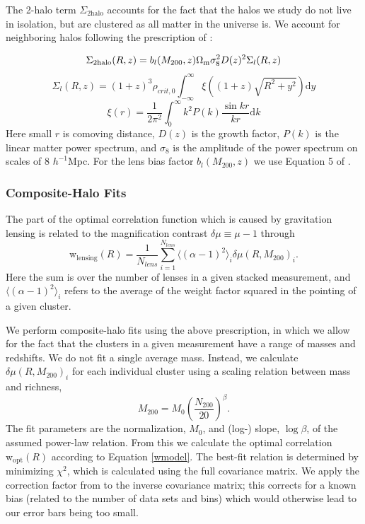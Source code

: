 The 2-halo term $\Sigma_{\mathrm{2halo}}$ accounts for the fact that the halos we study do not live in isolation, but are clustered as all matter in the universe is. We account for neighboring halos following the prescription of \citet{Johnston07}:

\begin{equation}
\Sigma_{\mathrm{2halo}}(R,z) = b_{l}(M_{200},z) \Omega_{\rm m} \sigma_8^2 D(z)^2 \Sigma_l(R,z)
\end{equation}
\begin{equation}
\Sigma_l(R,z) = (1+z)^3 \rho_{crit,0} \int_{-\infty}^\infty \xi\left( (1+z)\sqrt{R^2 + y^2} \right) \mathrm{d}y
\end{equation}
\begin{equation}
\xi(r) = \frac{1}{2\pi^2} \int_0^\infty k^2 P(k) \frac{\sin{kr}}{kr} \mathrm{d}k
\end{equation}
Here small $r$ is comoving distance, $D(z)$ is the growth factor, $P(k)$ is the linear matter power spectrum, and $\sigma_8$ is the amplitude of the power spectrum on scales of 8 $h^{-1}$Mpc. For the lens bias factor $b_{l}(M_{200},z)$ we use Equation 5 of \citet{Seljak04}.


\subsubsection{Composite-Halo Fits}
\label{multihalo}
The part of the optimal correlation function which is caused by gravitation lensing is related to the magnification contrast $\delta\mu \equiv \mu-1$ through
\begin{equation}
\label{wmodel}
\mathrm{w}_{\mathrm{lensing}}(R) = \frac{1}{N_{lens}} \sum_{i=1}^{N_{lens}} \langle(\alpha-1)^2\rangle_i \delta\mu(R,M_{200})_i.
\end{equation}
Here the sum is over the number of lenses in a given stacked measurement, and $\langle(\alpha-1)^2\rangle_i$ refers to the average of the weight factor squared in the pointing of a given cluster.

We perform composite-halo fits using the above prescription, in which we allow for the fact that the clusters in a given measurement have a range of masses and redshifts. We do not fit a single average mass. Instead, we calculate $\delta\mu(R,M_{200})_i$ for each individual cluster using a scaling relation between mass and richness,
\begin{equation}
\label{mr}
M_{200} = M_0 \left( \frac{N_{200}}{20} \right)^\beta.
\end{equation}
The fit parameters are the normalization, $M_0$, and (log-) slope, $\log\beta$, of the assumed power-law relation. From this we calculate the optimal correlation $\mathrm{w}_{\mathrm{opt}}(R)$ according to Equation \ref{wmodel}. The best-fit relation is determined by minimizing $\chi^2$, which is calculated using the full covariance matrix. We apply the correction factor from \citet{Hartlap07} to the inverse covariance matrix; this corrects for a known bias (related to the number of data sets and bins) which would otherwise lead to our error bars being too small.


